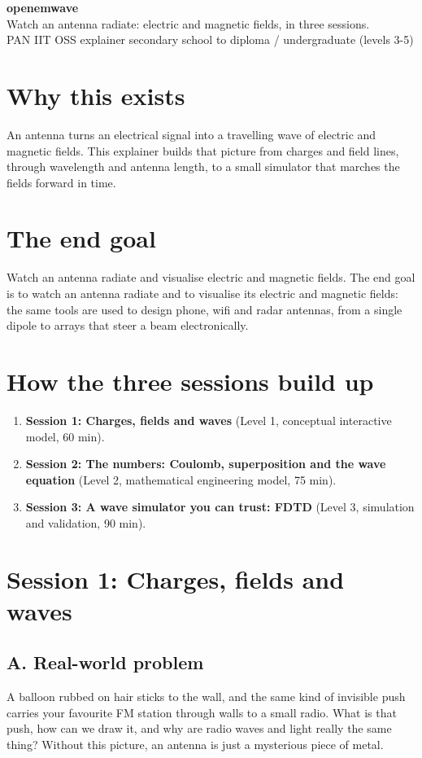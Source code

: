 \documentclass[11pt,a4paper]{article}
\begin{document}
\begin{center}{\LARGE\bfseries openemwave}\\[0.4em]{\large Watch an antenna radiate: electric and magnetic fields, in three sessions.}\\[0.2em]\small PAN IIT OSS explainer \textbullet{} secondary school to diploma / undergraduate (levels 3-5)\end{center}

\section*{Why this exists}
An antenna turns an electrical signal into a travelling wave of electric and magnetic fields. This explainer builds that picture from charges and field lines, through wavelength and antenna length, to a small simulator that marches the fields forward in time.

\section*{The end goal}
Watch an antenna radiate and visualise electric and magnetic fields. The end goal is to watch an antenna radiate and to visualise its electric and magnetic fields: the same tools are used to design phone, wifi and radar antennas, from a single dipole to arrays that steer a beam electronically.

\section*{How the three sessions build up}
\begin{enumerate}[nosep]
\item \textbf{Session 1: Charges, fields and waves} (Level 1, conceptual interactive model, 60 min).
\item \textbf{Session 2: The numbers: Coulomb, superposition and the wave equation} (Level 2, mathematical engineering model, 75 min).
\item \textbf{Session 3: A wave simulator you can trust: FDTD} (Level 3, simulation and validation, 90 min).
\end{enumerate}

\section{Session 1: Charges, fields and waves}

\subsection*{A. Real-world problem}
A balloon rubbed on hair sticks to the wall, and the same kind of invisible push carries your favourite FM station through walls to a small radio. What is that push, how can we draw it, and why are radio waves and light really the same thing? Without this picture, an antenna is just a mysterious piece of metal.
\end{document}
